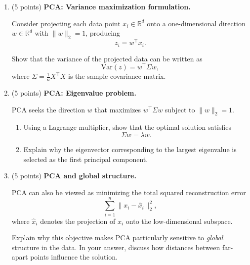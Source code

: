 \begin{enumerate}

\item (5 points) \textbf{PCA: Variance maximization formulation.}

Consider projecting each data point $x_i \in \mathbb{R}^d$ onto a one-dimensional
direction $w \in \mathbb{R}^d$ with $\|w\|_2 = 1$, producing
\[
z_i = w^\top x_i.
\]

Show that the variance of the projected data can be written as
\[
\mathrm{Var}(z) = w^\top \Sigma w,
\]
where $\Sigma = \frac{1}{n} X^\top X$ is the sample covariance matrix.

\begin{solution}

\end{solution}

\item (5 points) \textbf{PCA: Eigenvalue problem.}

PCA seeks the direction $w$ that maximizes $w^\top \Sigma w$ subject to $\|w\|_2 = 1$.

\begin{enumerate}
    \item Using a Lagrange multiplier, show that the optimal solution satisfies
    \[
    \Sigma w = \lambda w.
    \]
    \item Explain why the eigenvector corresponding to the largest eigenvalue
    is selected as the first principal component.
\end{enumerate}


\begin{solution}

\end{solution}

\item (5 points) \textbf{PCA and global structure.}

PCA can also be viewed as minimizing the total squared reconstruction error
\[
\sum_{i=1}^{n} \|x_i - \hat{x}_i\|_2^2,
\]
where $\hat{x}_i$ denotes the projection of $x_i$ onto the low-dimensional
subspace.

Explain why this objective makes PCA particularly sensitive to \emph{global}
structure in the data. In your answer, discuss how distances between far-apart
points influence the solution.


\end{enumerate}
